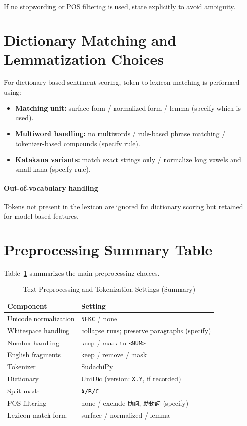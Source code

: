 \noindent If no stopwording or POS filtering is used, state explicitly to avoid ambiguity.

\section{Dictionary Matching and Lemmatization Choices}
\label{appendix:dictionary_matching}

For dictionary-based sentiment scoring, token-to-lexicon matching is performed using:

\begin{itemize}
  \item \textbf{Matching unit:} surface form / normalized form / lemma (specify which is used).
  \item \textbf{Multiword handling:} no multiwords / rule-based phrase matching / tokenizer-based compounds (specify rule).
  \item \textbf{Katakana variants:} match exact strings only / normalize long vowels and small kana (specify rule).
\end{itemize}

\paragraph{Out-of-vocabulary handling.}
Tokens not present in the lexicon are ignored for dictionary scoring but retained for model-based features.

\section{Preprocessing Summary Table}
\label{appendix:preprocess_summary}

Table~\ref{tab:preprocess_summary} summarizes the main preprocessing choices.

\begin{table}[h]
\centering
\caption{Text Preprocessing and Tokenization Settings (Summary)}
\label{tab:preprocess_summary}
\begin{tabular}{ll}
\toprule
\textbf{Component} & \textbf{Setting} \\
\midrule
Unicode normalization & \texttt{NFKC} / none \\
Whitespace handling & collapse runs; preserve paragraphs (specify) \\
Number handling & keep / mask to \texttt{<NUM>} \\
English fragments & keep / remove / mask \\
Tokenizer & SudachiPy \\
Dictionary & UniDic (version: \texttt{X.Y}, if recorded) \\
Split mode & \texttt{A/B/C} \\
POS filtering & none / exclude \texttt{助詞}, \texttt{助動詞} (specify) \\
Lexicon match form & surface / normalized / lemma \\
\bottomrule
\end{tabular}
\end{table}

